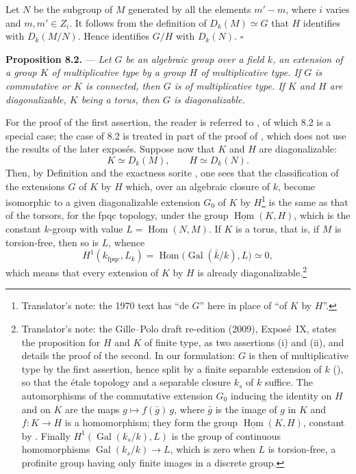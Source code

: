 Let \(N\) be the subgroup of \(M\) generated by all the elements
\(m'-m\), where \(i\) varies and \(m,m'\in Z_i\). It follows from the
definition of \(D_k(M)\simeq G\) that \(H\) identifies with
\(D_k(M/N)\). Hence  identifies \(G/H\) with \(D_k(N)\).
\hfill\(\square\)

\medskip
\noindent{}\textbf{Proposition 8.2.} ---
\textit{Let \(G\) be an algebraic group over a field \(k\), an extension
of a group \(K\) of multiplicative type by a group \(H\) of multiplicative
type. If \(G\) is commutative or \(K\) is connected, then \(G\) is of
multiplicative type. If \(K\) and \(H\) are diagonalizable, \(K\) being a
torus, then \(G\) is diagonalizable.}

For the proof of the first assertion, the reader is referred to
, of which 8.2 is a
special case; the case of 8.2 is treated in part
 of the proof of
, which does not use
the results of the later expos\'es. Suppose now that \(K\) and \(H\) are
diagonalizable:
\[
  K\simeq D_k(M),
  \qquad
  H\simeq D_k(N).
\]
Then, by Definition  and the
exactness sorite , one sees
that the classification of the extensions \(G\) of \(K\) by \(H\) which,
over an algebraic closure of \(k\), become isomorphic to a given
diagonalizable extension \(G_0\) of \(K\) by \(H\)\footnote{Translator's note:
the 1970 text has ``de \(G\)'' here in place of ``of \(K\) by \(H\)''.} is
the same as that of
the torsors, for the fpqc topology, under the group
\(\underline{\operatorname{Hom}}(K,H)\), which is the constant
\(k\)-group with value \(L=\operatorname{Hom}(N,M)\). If \(K\) is a torus,
that is, if \(M\) is torsion-free, then so is \(L\), whence
\[
  H^1(k_{\mathrm{fpqc}},L_k)
  =\operatorname{Hom}\bigl(\operatorname{Gal}(\bar k/k),L\bigr)
  \simeq0,
\]
which means that every extension of \(K\) by \(H\) is already
diagonalizable.\footnote{Translator's note: the Gille--Polo draft
re-edition (2009), Expos\'e~IX, states the proposition for \(H\) and \(K\) of
finite type, as two assertions (i) and (ii), and details the proof of the
second. In our formulation: \(G\) is then of multiplicative type by the
first assertion, hence split by a finite separable extension of \(k\)
(), so that the \'etale topology
and a separable closure \(k_s\) of \(k\) suffice. The automorphisms of the
commutative extension \(G_0\) inducing the identity on \(H\) and on \(K\)
are the maps \(g\mapsto f(\bar g)\,g\), where \(\bar g\) is the image of
\(g\) in \(K\) and \(f:K\to H\) is a homomorphism; they form the group
\(\underline{\operatorname{Hom}}(K,H)\), constant by
. Finally
\(H^1(\operatorname{Gal}(k_s/k),L)\) is the group of continuous
homomorphisms \(\operatorname{Gal}(k_s/k)\to L\), which is zero when \(L\)
is torsion-free, a profinite group having only finite images in a discrete
group.}

